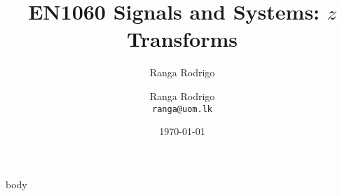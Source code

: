 \documentclass[t, aspectratio=169,xcolor={svgnames}, 10pt]{beamer}
\title{EN1060 Signals and Systems: $z$ Transforms}
\author{Ranga Rodrigo}
\author[]{Ranga Rodrigo\\ \texttt{ranga@uom.lk}}
\institute[]{The University of Moratuwa, Sri Lanka}
\date{\today}
\begin{document}
    \begin{frame}
        \titlepage
    \end{frame}
















    {body}


\end{document}
